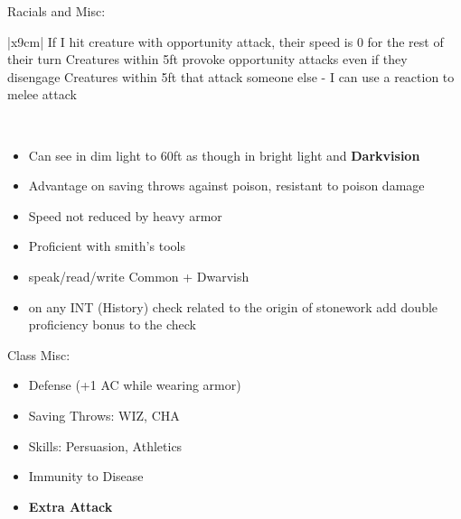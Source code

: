 \documentclass[12pt, xcolor={dvipsnames}]{beamer}
\newcommand{\tn}{\tabularnewline\hline}
\newcommand{\wiz}{{\color{red}WIZ}}
\newcommand{\inte}{{\color{red}INT}}
\newcommand{\cha}{{\color{red}CHA}}
\begin{document}
\begin{frame}
  \tiny
  Racials and Misc:\\ \vspace{1em}

  \begin{tabular}{|x{9cm}|} \hline
    \tn
    If I hit creature with opportunity attack, their speed is 0 for the rest of their turn\tn
    Creatures within 5ft provoke opportunity attacks even if they disengage\tn
    Creatures within 5ft that attack someone else - I can use a reaction to melee attack\tn
  \end{tabular}\\ \vspace{1em}

  \begin{itemize}
    \small

    \item Can see in dim light to 60ft as though in bright light
      and \textbf{\color{DarkOrchid}Darkvision}

    \item Advantage on saving throws against poison, resistant to poison damage

    \item Speed not reduced by heavy armor

    \item Proficient with smith's tools

    \item speak/read/write Common + Dwarvish

    \item on any {\inte} (History) check related to the origin of stonework
      add double proficiency bonus to the check
  \end{itemize}
\end{frame}

\begin{frame}
  Class Misc:
  \begin{itemize}
    \item Defense (+1 AC while wearing armor)

    \item Saving Throws:  {\wiz}, {\cha}

    \item Skills: Persuasion, Athletics

    \item Immunity to Disease

    \item \textbf{Extra Attack}
  \end{itemize}
\end{frame}
\end{document}
